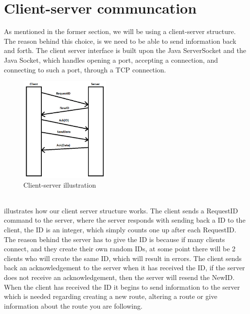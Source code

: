 \section{Client-server communcation}
As mentioned in the former section, we will be using a client-server structure. The reason behind this choice, is we need to be able to send information back and forth.
The client server interface is built upon the Java ServerSocket and the Java Socket, which handles opening a port, accepting a connection, and connecting to such a port, through a TCP connection.
\begin{figure}[h!]
  \centering
    \includegraphics[width=0.4\textwidth]{figures/clientserver.png}
    \caption{Client-server illustration}
    \label{fig:client-server}
\end{figure}
\\
 illustrates how our client server structure works. The client sends a RequestID command to the server, where the server responds with sending back a ID to the client, the ID is an integer, which simply counts one up after each RequestID. The reason behind the server has to give the ID is because if many clients connect, and they create their own random IDs, at some point there will be 2 clients who will create the same ID, which will result in errors. The client sends back an acknowledgement to the server when it has received the ID, if the server does not receive an acknowledgement, then the server will resend the NewID. When the client has received the ID it begins to send information to the server which is needed regarding creating a new route, altering a route or give information about the route you are following.

